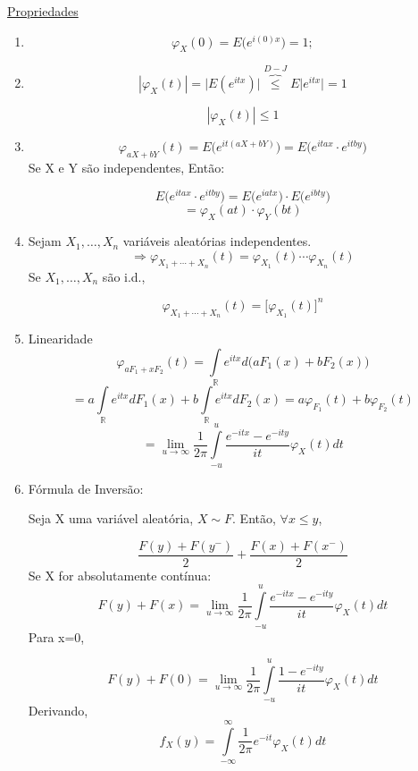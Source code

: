 \documentclass[a4paper,12pt]{article}
\begin{document}
\begin{enumerate}
\begin{itemize}
\underline{Propriedades}
\begin{enumerate}
	\item $$\varphi_X(0) = E\bigg(e^{i(0)x}\bigg)=1;$$
	\item $$|\varphi_X(t)| = \bigg|
	E(e^{itx})
	\bigg| \overbrace{\le}^{D-J}E\bigg|
	e^{itx}
	\bigg|=1$$
	
	$$|\varphi_X(t)|\le 1$$
	\item $$\varphi_{aX+bY}(t) = E\bigg(
	e^{it(aX+bY)}
	\bigg) = 
	 E\bigg(
	e^{itax}\cdot e^{itby}
	\bigg) 
$$
	Se X e Y são independentes, Então:
	
	$$ 
	E\bigg(
	e^{itax}\cdot e^{itby}
	\bigg) =
	E\bigg(
	e^{iatx}
	\bigg)\cdot E\bigg(
	e^{ibty}	\bigg)	
	$$
	$$=\varphi_X(at) \cdot \varphi_Y(bt) $$
	\item Sejam $X_1,\ldots, X_n$ variáveis aleatórias independentes.
	$$\Rightarrow \varphi_{X_1+\cdots+X_n}(t) =\varphi_{X_1}(t)\cdots  \varphi_{X_n}(t) $$
	Se $X_1,\ldots,X_n$ são i.d.,
	
	$$\varphi_{X_1+\cdots+X_n}(t) = \bigg[
	\varphi_{X_1}(t)
	\bigg]^n $$
	
	\item Linearidade
	$$\varphi_{aF_1+xF_2}(t) = \int\limits_{\mathbb R} e^{itx}d\bigg(aF_1(x) + bF_2(x)\bigg) $$
	$$= a\int\limits_{\mathbb R} e^{itx}dF_1(x) + b \int\limits_{\mathbb R} e^{itx}dF_2(x)
	= a\varphi_{F_1}(t) + b\varphi_{F_2}(t)$$
	$$
	= \lim\limits_{u\rightarrow \infty}  \frac{1}{2\pi} \int\limits_{-u}^{u} \frac{e^{-itx}- e^{-ity}}{it}\varphi_X(t)dt
	 $$
	\item Fórmula de Inversão:
	
	Seja X uma variável aleatória, $X\sim F$. Então, $\forall x\le y$, 
	
	$$\frac{F(y)+F(y^-)}{2} + \frac{F(x)+F(x^-)}{2} $$
	$$ $$
	Se X for absolutamente contínua:
	$$F(y) + F(x)= \lim\limits_{u\rightarrow \infty}  \frac{1}{2\pi} \int\limits_{-u}^{u} \frac{e^{-itx}- e^{-ity}}{it}\varphi_X(t)dt $$
	Para x=0,
	
	$$F(y) + F(0)= \lim\limits_{u\rightarrow \infty}  \frac{1}{2\pi} \int\limits_{-u}^{u} \frac{1- e^{-ity}}{it}\varphi_X(t)dt $$
	Derivando,
	$$f_X(y) = \int\limits_{-\infty}^{\infty} \frac{1}{2\pi} e^{-it}\varphi_X(t)dt $$
\end{enumerate}

\end{itemize}


\end{enumerate}

\newpage 
\end{document}
